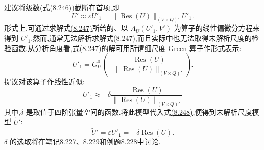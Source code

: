 \begin{note}[建模步骤]
\label{note:vms-modeling-step}
\textcite{Bazilevs2007} 建议将级数(式\hyperref[eq:vms-perturbation-series]{(8.246)})截断在首项,即
\begin{equation}\label{eq:vms-truncated-unresolved-scale}
 U'\approx\varepsilon U'_1
 =\|\operatorname{Res}(U)\|_{(V\times Q)'}U'_1.
\end{equation}
形式上,可通过求解式\hyperref[eq:vms-perturbation-first-order]{(8.247)}所给的、以 $A_U(U'_1,V')$ 为算子的线性偏微分方程来得到 $U'_1$.然而,通常无法解析求解式(8.247),而且实际中也无法取得未解析尺度的检验函数.从分析角度看,式(8.247)的解可用所谓细尺度 Green 算子作形式表示:
\[
 U'_1=G_U^0\!\left(-\frac{\operatorname{Res}(U)}
 {\|\operatorname{Res}(U)\|_{(V\times Q)'}}\right).
\]
\textcite{Bazilevs2007} 提议对该算子作线性近似:
\[
 U'_1\approx-\delta\frac{\operatorname{Res}(U)}
 {\|\operatorname{Res}(U)\|_{(V\times Q)'}}
\]
其中,$\delta$ 是取值于四阶张量空间的函数.将此模型代入式\hyperref[eq:vms-truncated-unresolved-scale]{(8.248)},便得到未解析尺度模型 $\widetilde U'$:
\[
 \widetilde U'=\varepsilon U'_1=-\delta\operatorname{Res}(U).
\]
$\delta$ 的选取将在笔记\hyperref[note:vms-stabilization-parameter]{8.227}、\hyperref[note:vms-stabilization-parameter-comments]{8.229}和例题\hyperref[ex:vms-axis-aligned-cube]{8.228}中讨论.
\end{note}

